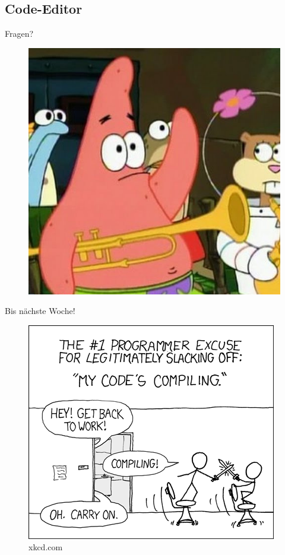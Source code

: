 \documentclass[18pt]{beamer}
\begin{document}
\subsection{Code-Editor}

\appendix

\beginbackup

\begin{frame}{Fragen?}
    \begin{figure}
        \includegraphics[scale=.3]{img/fragen.jpg}
    \end{figure}
\end{frame}

\begin{frame}{Bis nächste Woche!}
    \begin{figure}
        \includegraphics[scale=.4]{img/compiling.png}
        \caption{\footnotesize{xkcd.com}}
    \end{figure}
\end{frame}

\backupend
\end{document}

